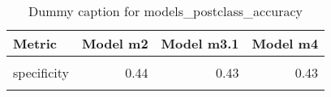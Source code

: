 \begin{table}
\centering
\caption{Dummy caption for models_postclass_accuracy}
\centering
\fontsize{10}{12}\selectfont
\begin{tabular}[t]{lrrr}
\toprule
Metric & Model m2 & Model m3.1 & Model m4\\
\midrule
\cellcolor{gray!10}{sensitivity} & \cellcolor{gray!10}{0.82} & \cellcolor{gray!10}{0.82} & \cellcolor{gray!10}{0.82}\\
specificity & 0.44 & 0.43 & 0.43\\
\cellcolor{gray!10}{overall\_accuracy} & \cellcolor{gray!10}{0.68} & \cellcolor{gray!10}{0.68} & \cellcolor{gray!10}{0.68}\\
\bottomrule
\end{tabular}
\end{table}
